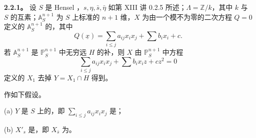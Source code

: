 \textbf{2.2.1。} 设 $S$ 是 Hensel ，$s,\eta,\bar s,\bar\eta$ 如第 XIII 讲 0.2.5 所述；$\Lambda=\mathbb Z/k$，其中 $k$ 与 $S$ 的互素；$\mathbb A_S^{n+1}$ 为 $S$ 上标准的 $n+1$ 维，$X$ 为由一个模不为零的二次方程 $Q=0$ 定义的 $\mathbb A_S^{n+1}$ 的，其中
\[
 Q(\underline x)=\sum_{i\leq j}a_{ij}x_i x_j+\sum b_i x_i+c.
\]
若 $\mathbb A_S^{n+1}$ 是 $\mathbb P_S^{n+1}$ 中无穷远 $H$ 的补，则 $X$ 由 $\mathbb P_S^{n+1}$ 中方程
\[
 \sum_{i\leq j}a_{ij}x_i x_j+\sum b_i x_i z+cz^2=0\tag{2.2.1.1}
\]
定义的 $X_1$ 去掉 $Y=X_1\cap H$ 得到。

作如下假设。

(a) $Y$ 是 $S$ 上的，即 $\sum_{i\leq j}a_{ij}x_i x_j$ 是；

(b)  $X'_s$ 是，即 $X_{\bar s}$ 为。

